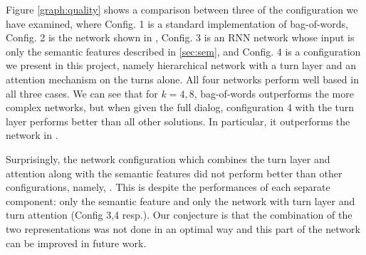 Figure \ref{graph:quality} shows a comparison between three of the configuration 
we have examined, where Config. 1 is a standard implementation of bag-of-words, 
Config. 2 is the network shown in \cite{attention},  Config. 3 is 
an RNN network whose input is only the semantic features described in \ref{sec:sem}, and Config. 4 is a configuration 
we present in this project, namely hierarchical network with a turn layer and an attention mechanism on the turns alone. 
All four networks perform well based in all three cases. 
We can see that for $k=4,8$, bag-of-words outperforms the more complex 
networks, but when given the full dialog, configuration 4 with the turn layer performs 
better than all other solutions. 
In particular, it outperforms the network in \cite{attention}. 

Surprisingly, the network configuration which combines the turn layer and attention along with the 
semantic features did not perform better than other configurations, namely, 
. 
This is despite the performances of each separate component: only the semantic feature and 
only the network with turn layer and turn attention (Config 3,4 resp.). 
Our conjecture is that the combination of the two representations was not done 
in an optimal way and this part of the network can be improved in future work. 







